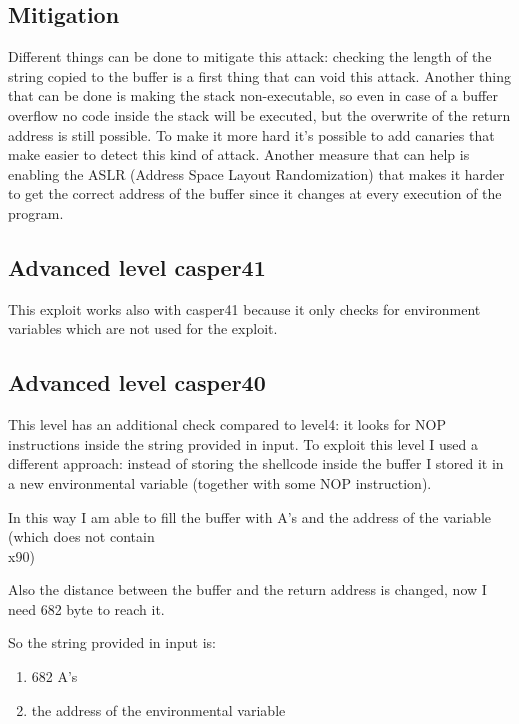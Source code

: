 \documentclass[a4paper,12pt]{article}
\begin{document}

\subsection{Mitigation}

Different things can be done to mitigate this attack: checking the length of the string copied to the buffer is a first thing that can void this attack. Another thing that can be done is making the stack non-executable, so even in case of a buffer overflow no code inside the stack will be executed, but the overwrite of the return address is still possible. To make it more hard it's possible to add canaries that make easier to detect this kind of attack. Another measure that can help is enabling the ASLR (Address Space Layout Randomization) that makes it harder to get the correct address of the buffer since it changes at every execution of the program.

\subsection{Advanced level casper41}

This exploit works also with casper41 because it only checks for environment variables which are not used for the exploit. 

\subsection{Advanced level casper40}

This level has an additional check compared to level4: it looks for NOP instructions inside the string provided in input. To exploit this level I used a different approach: instead of storing the shellcode inside the buffer I stored it in a new environmental variable (together with some NOP instruction).  

In this way I am able to fill the buffer with A's and the address of the variable (which does not contain \\x90)

Also the distance between the buffer and the return address is changed, now I need 682 byte to reach it.

So the string provided in input is:
\begin{enumerate}
\item 682 A's
\item the address of the environmental variable
\end{enumerate}
\end{document}
